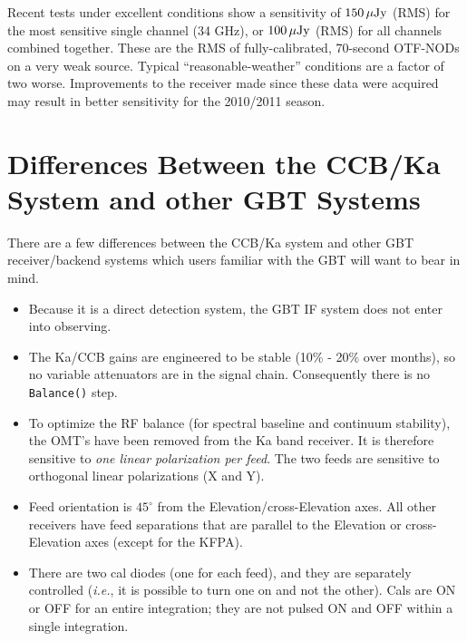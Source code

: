 Recent tests under excellent conditions show a sensitivity of $150
\, \mu {\rm Jy}$ (RMS) for the most sensitive single channel (34 GHz),
or $100 \, \mu {\rm Jy}$ (RMS) for all channels combined
together. These are the RMS of fully-calibrated, 70-second OTF-NODs on
a very weak source.  Typical ``reasonable-weather'' conditions are a
factor of two worse.  Improvements to the receiver made since these
data were acquired may result in better sensitivity for the 2010/2011
season.

\section{Differences Between the CCB/Ka System and other GBT Systems}

There are a few differences between the CCB/Ka system and other GBT
receiver/backend systems which users familiar with the GBT will want
to bear in mind.
\begin{itemize}

\item Because it is a direct detection system, the GBT IF system does not enter into observing. 

\item The Ka/CCB gains are engineered to be stable (10\% - 20\% over months), so no variable attenuators are in the signal
chain. Consequently there is no {\tt Balance()} step.

\item To optimize the RF balance (for spectral baseline and continuum stability), the OMT's have been
removed from the Ka band receiver. It is therefore sensitive to {\it
one linear polarization per feed}.  The two feeds are sensitive to
orthogonal linear polarizations (X and Y).

\item Feed orientation is $45^\circ$ from the Elevation/cross-Elevation axes.
All other receivers have feed separations that are parallel to the Elevation
or cross-Elevation axes (except for the \gls{KFPA}).

\item There are two cal diodes (one for each feed), and they are separately controlled ({\it i.e.}, it is
possible to turn one on and not the other). Cals are ON or OFF for an
entire integration; they are not pulsed ON and OFF within a single
integration.

\end{itemize}




